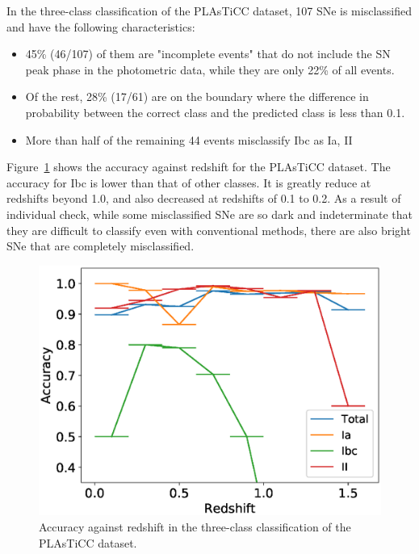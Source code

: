 \documentclass[useamsfonts]{pasj01}
\begin{document}
In the three-class classification of the PLAsTiCC dataset,
107 SNe is misclassified and have the following characteristics:
\begin{itemize}
\item 45\% (46/107) of them are "incomplete events" that do not include the SN peak phase in the photometric data, while they are only 22\% of all events.
\item Of the rest, 28\% (17/61) are on the boundary where the difference in probability between the correct class and the predicted class is less than 0.1.
\item More than half of the remaining 44 events misclassify Ibc as Ia, II
\end{itemize}
Figure\ \ref{fig:misclass_rate_3class} shows the accuracy against redshift for the PLAsTiCC dataset.
The accuracy for Ibc is lower than that of other classes.
It is greatly reduce at redshifts beyond 1.0, and also decreased at redshifts of 0.1 to 0.2.
As a result of individual check, while some misclassified SNe are so dark and indeterminate that they are difficult to classify even with conventional methods, there are also bright SNe that are completely misclassified.
%
\begin{figure}[htbp]
  \begin{center}
     \includegraphics[width=\columnwidth]{figures/misclass_rate_plastic_3class.eps}
  \end{center}
  \caption{%
  Accuracy against redshift in the three-class classification of the PLAsTiCC dataset.
  }%
  \label{fig:misclass_rate_3class}
\end{figure}
%
%
\end{document}
